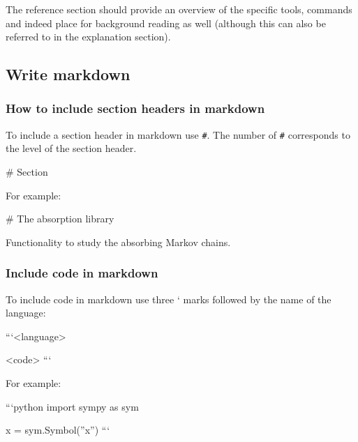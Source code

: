 The reference section should provide an overview of the specific tools, commands
and indeed place for background reading as well (although this can also be
referred to in the explanation section).

\subsection{Write markdown}
\label{sec:how_to_write_markdown}

\subsubsection{How to include section headers in markdown}
\label{\detokenize{building-tools/06-documentation/how/main:how-to-include-section-headers-in-markdown}}\label{\detokenize{building-tools/06-documentation/how/main:id5}}

To include a section header in markdown use \texttt{\#}. The number of \texttt{\#} corresponds
to the level of the section header.

\begin{md}
# Section
\end{md}


For example:

\begin{md}
# The absorption library

Functionality to study the absorbing Markov chains.
\end{md}




\subsubsection{Include code in markdown}
\label{\detokenize{building-tools/06-documentation/how/main:how-to-include-code-in-markdown}}\label{\detokenize{building-tools/06-documentation/how/main:id6}}

To include code in markdown use three ` marks followed by the name of the
language:

\begin{md}
```<language>

<code>
```
\end{md}


For example:

\begin{md}
```python
import sympy as sym

x = sym.Symbol(''x'')
```
\end{md}


